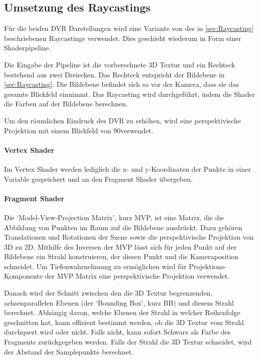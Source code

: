 \documentclass[a4paper,fontsize=12pt,toc=bib,halfparskip,ngerman]{scrartcl}
\begin{document}
\subsection{Umsetzung des Raycastings}
\label{RaycastingImplementation}

F\"ur die beiden DVR Darstellungen wird eine Variante von des in \cref{sec:Raycasting} beschriebenen Raycastings verwendet. Dies geschieht wiederum in Form einer Shaderpipeline.

Die Eingabe der Pipeline ist die vorberechnete 3D Textur und ein Rechteck bestehend aus zwei Dreiecken. Das Rechteck entspricht der Bildebene in \cref{sec:Raycasting}. Die Bildebene befindet sich so vor der Kamera, dass sie das gesamte Blickfeld einnimmt. Das Raycasting wird durchgef\"uhrt, indem die Shader die Farben auf der Bildebene berechnen.

Um den r\"aumlichen Eindruck des DVR zu erh\"ohen, wird eine perspektivische Projektion mit einem Blickfeld von 90\textdegree verwendet.

\paragraph{Vertex Shader}
Im Vertex Shader werden lediglich die x- und y-Koordinaten der Punkte in einer Variable gespeichert und an den Fragment Shader \"ubergeben.

\paragraph{Fragment Shader}
Die `Model-View-Projection Matrix', kurz MVP, ist eine Matrix, die die Abbildung von Punkten im Raum auf die Bildebene ausdr\"uckt. Dazu geh\"oren Translationen und Rotationen der Szene sowie die perspektivische Projektion von 3D zu 2D. Mithilfe des Inversen der MVP l\"asst sich f\"ur jeden Punkt auf der Bildebene ein Strahl konstruieren, der diesen Punkt und die Kameraposition schneidet. Um Tiefenwahrnehmung zu erm\"oglichen wird f\"ur Projektions-Komponente der MVP Matrix eine perspektivische Projektion verwendet.

Danach wird der Schnitt zwischen den die 3D Textur begrenzenden, achsenparallelen Ebenen (der `Bounding Box', kurz BB) und diesem Strahl berechnet. Abh\"angig davon, welche Ebenen der Strahl in welcher Reihenfolge geschnitten hat, kann effizient bestimmt werden, ob die 3D Textur vom Strahl durchquert wird oder nicht. Falls nicht, kann sofort Schwarz als Farbe des Fragments zur\"uckgegeben werden. Falls der Strahl die 3D Textur schneidet, wird der Abstand der Samplepunkte berechnet. 
\end{document}
